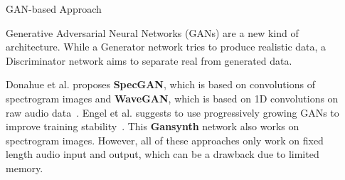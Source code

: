 \documentclass[final,hyperref={pdfpagelabels=false}]{beamer}
\newcommand{\blocktextwidth}{0.93\textwidth}
\begin{document}
\begin{frame}[t]
\begin{columns}[t]
\begin{column}{0.6375\textwidth}
\begin{columns}[T]
\begin{column}{0.486\textwidth}





\begin{block}{GAN-based Approach}
\begin{minipage}[]{\blocktextwidth}
Generative Adversarial Neural Networks (GANs) are a new kind of architecture.
While a Generator network tries to produce realistic data, a Discriminator network aims to separate real from generated data.

Donahue et al. proposes \textbf{SpecGAN}, which is based on convolutions of spectrogram images and \textbf{WaveGAN}, which is based on 1D convolutions on raw audio data~\cite{donahue2018adversarial}.
Engel et al. suggests to use progressively growing GANs to improve training stability~\cite{engel2019gansynth}.
This \textbf{Gansynth} network also works on spectrogram images.
However, all of these approaches only work on fixed length audio input and output, which can be a drawback due to limited memory.

\end{minipage}
\end{block}





\end{column}

\hfill


\begin{column}{0.486\textwidth}





\end{column}
\end{columns}
\end{column}
\end{columns}
\end{frame}
\end{document}
